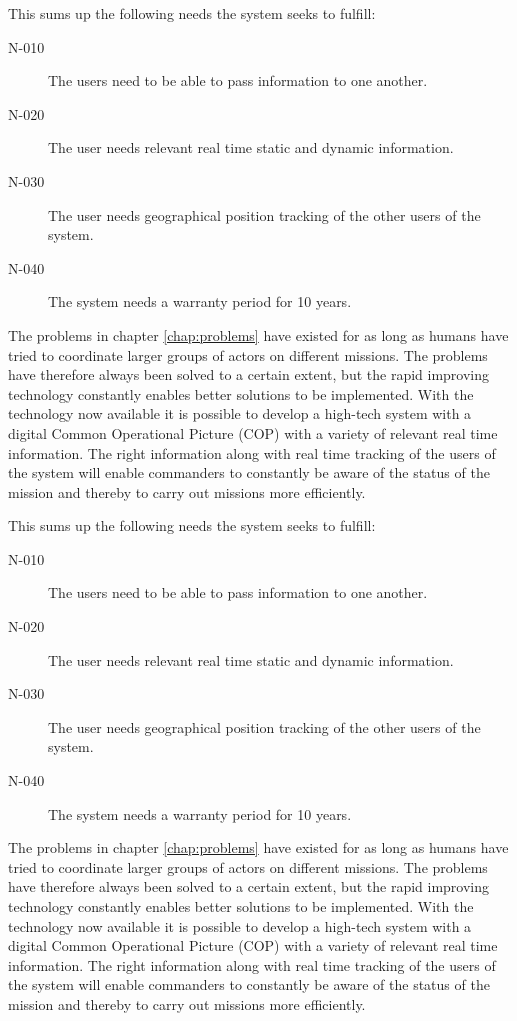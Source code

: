 This sums up the following needs the system seeks to fulfill:

\begin{description}
\item[N-010] The users need to be able to pass information to one another. 
\item[N-020] The user needs relevant real time static and dynamic information. 
\item[N-030] The user needs geographical position tracking of the other users of the system.
\item[N-040] The system needs a warranty period for 10 years. 
\end{description}
	
The problems in chapter \ref{chap:problems} have existed for as long as humans have tried to coordinate larger groups of actors on different missions. The problems have therefore always been solved to a certain extent, but the rapid improving technology constantly enables better solutions to be implemented. With the technology now available it is possible to develop a high-tech system with a digital Common Operational Picture (COP) with a variety of relevant real time information. The right information along with real time tracking of the users of the system will enable commanders to constantly be aware of the status of the mission and thereby to carry out missions more efficiently. 

This sums up the following needs the system seeks to fulfill:

\begin{description}
\item[N-010] The users need to be able to pass information to one another. 
\item[N-020] The user needs relevant real time static and dynamic information. 
\item[N-030] The user needs geographical position tracking of the other users of the system.
\item[N-040] The system needs a warranty period for 10 years. 
\end{description}
	
The problems in chapter \ref{chap:problems} have existed for as long as humans have tried to coordinate larger groups of actors on different missions. The problems have therefore always been solved to a certain extent, but the rapid improving technology constantly enables better solutions to be implemented. With the technology now available it is possible to develop a high-tech system with a digital Common Operational Picture (COP) with a variety of relevant real time information. The right information along with real time tracking of the users of the system will enable commanders to constantly be aware of the status of the mission and thereby to carry out missions more efficiently. 


